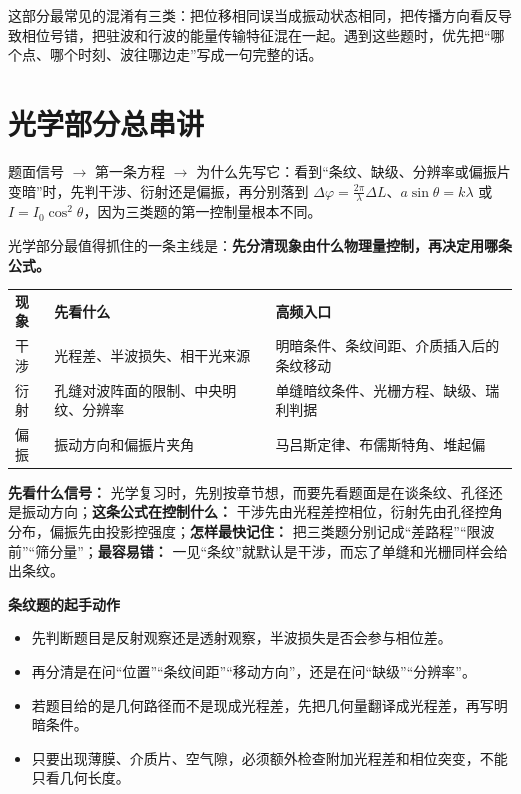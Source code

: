 \documentclass[lang=cn,11pt]{elegantbook}
\newcommand{\bridge}[1]{\begin{note}#1\end{note}}
\begin{document}
\begin{remark}
这部分最常见的混淆有三类：把位移相同误当成振动状态相同，把传播方向看反导致相位号错，把驻波和行波的能量传输特征混在一起。遇到这些题时，优先把“哪个点、哪个时刻、波往哪边走”写成一句完整的话。
\end{remark}

\section{光学部分总串讲}

\bridge{题面信号 \(\rightarrow\) 第一条方程 \(\rightarrow\) 为什么先写它：看到“条纹、缺级、分辨率或偏振片变暗”时，先判干涉、衍射还是偏振，再分别落到 \(\Delta\varphi=\frac{2\pi}{\lambda}\Delta L\)、\(a\sin\theta=k\lambda\) 或 \(I=I_0\cos^2\theta\)，因为三类题的第一控制量根本不同。}

光学部分最值得抓住的一条主线是：\textbf{先分清现象由什么物理量控制，再决定用哪条公式。}

\begin{center}
\renewcommand{\arraystretch}{1.2}
\begin{tabular}{>{\raggedright\arraybackslash}p{} >{\raggedright\arraybackslash}p{} >{\raggedright\arraybackslash}p{}}
\textbf{现象} & \textbf{先看什么} & \textbf{高频入口} \\
干涉 & 光程差、半波损失、相干光来源 & 明暗条件、条纹间距、介质插入后的条纹移动 \\
衍射 & 孔缝对波阵面的限制、中央明纹、分辨率 & 单缝暗纹条件、光栅方程、缺级、瑞利判据 \\
偏振 & 振动方向和偏振片夹角 & 马吕斯定律、布儒斯特角、堆起偏 \\
\end{tabular}
\end{center}

\begin{note}
\textbf{先看什么信号：} 光学复习时，先别按章节想，而要先看题面是在谈条纹、孔径还是振动方向；\textbf{这条公式在控制什么：} 干涉先由光程差控相位，衍射先由孔径控角分布，偏振先由投影控强度；\textbf{怎样最快记住：} 把三类题分别记成“差路程”“限波前”“筛分量”；\textbf{最容易错：} 一见“条纹”就默认是干涉，而忘了单缝和光栅同样会给出条纹。
\end{note}

\textbf{条纹题的起手动作}

\begin{itemize}
  \item 先判断题目是反射观察还是透射观察，半波损失是否会参与相位差。
  \item 再分清是在问“位置”“条纹间距”“移动方向”，还是在问“缺级”“分辨率”。
  \item 若题目给的是几何路径而不是现成光程差，先把几何量翻译成光程差，再写明暗条件。
  \item 只要出现薄膜、介质片、空气隙，必须额外检查附加光程差和相位突变，不能只看几何长度。
\end{itemize}
\end{document}
